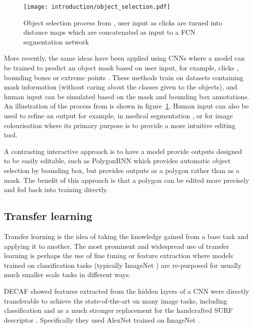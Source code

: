 \begin{figure}[h]
  \centering
  \texttt{[image: introduction/object\_selection.pdf]}
  \caption{Object selection process from \cite{Xu2016b}, user input as clicks are turned into distance maps which are concatenated as input to a \gls{FCN} segmentation network}  
  \label{fig:object_selection}
\end{figure}

More recently, the same ideas have been applied using \gls{CNN}s where a model can be trained to predict an object mask based on user input, for example, clicks \cite{Xu2016b, Boroujerdi2017}, bounding boxes \cite {Xu2017} or extreme points \cite{Maninis2017}. These methods train on datasets containing mask information (without caring about the classes given to the objects), and human input can be simulated based on the mask and bounding box annotations. An illustration of the process from \cite{Xu2016b} is shown in figure~\ref{fig:object_selection}. Human input can also be used to refine an output for example, in medical segmentation \cite{Wang2017}, or for image colourisation \cite{Zhang} where its primary purpose is to provide a more intuitive editing tool.

A contrasting interactive approach is to have a model provide outputs designed to be easily editable, such as PolygonRNN \cite{Castrejon2017} which provides automatic object selection by bounding box, but provides outputs as a polygon rather than as a mask. The benefit of this approach is that a polygon can be edited more precisely and fed back into training directly.


\subsection {Transfer learning}

Transfer learning is the idea of taking the knowledge gained from a base task and applying it to another. The most prominent and widespread use of transfer learning is perhaps the use of fine tuning or feature extraction where models trained on classification tasks (typically ImageNet \cite{JiaDeng2009}) are re-purposed for usually much smaller scale tasks in different ways. 

\gls{DECAF} \cite{Donahue2014} showed features extracted from the hidden layers of a \gls{CNN} were directly transferable to achieve the state-of-the-art on many image tasks, including classification and as a much stronger replacement for the handcrafted \gls{SURF} descriptor \cite{bay2006surf}.  Specifically they used AlexNet  \cite{Krizhevsky2012} trained on ImageNet \cite{JiaDeng2009}.

